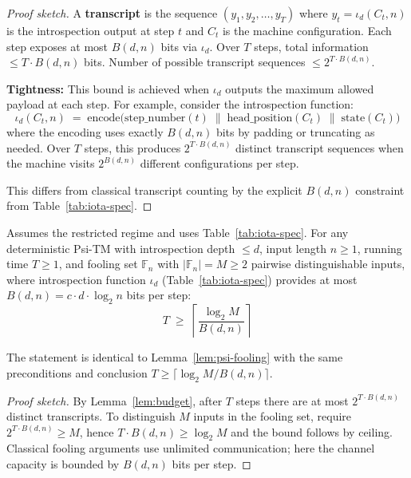 \begin{proof}[Proof sketch]
A \textbf{transcript} is the sequence $(y_1, y_2, \ldots, y_T)$ where $y_t = \iota_d(C_t, n)$ is the introspection output at step $t$ and $C_t$ is the machine configuration. Each step exposes at most $B(d,n)$ bits via $\iota_d$. Over $T$ steps, total information $\leq T \cdot B(d,n)$ bits. Number of possible transcript sequences $\leq 2^{T \cdot B(d,n)}$.

\textbf{Tightness:} This bound is achieved when $\iota_d$ outputs the maximum allowed payload at each step. For example, consider the introspection function:
\[
\iota_d(C_t, n) \;=\; \text{encode}\big(\text{step\_number}(t) \;\|\; \text{head\_position}(C_t) \;\|\; \text{state}(C_t)\big)
\]
where the encoding uses exactly $B(d,n)$ bits by padding or truncating as needed. Over $T$ steps, this produces $2^{T \cdot B(d,n)}$ distinct transcript sequences when the machine visits $2^{B(d,n)}$ different configurations per step.

This differs from classical transcript counting by the explicit $B(d,n)$ constraint from Table~\ref{tab:iota-spec}.
\end{proof}

\begin{lemma}
\label{lem:psi-fooling}
Assumes the restricted regime and uses Table~\ref{tab:iota-spec}.
For any deterministic Psi-TM with introspection depth $\leq d$, input length $n \geq 1$, running time $T \geq 1$, and fooling set $\mathbb{F}_n$ with $|\mathbb{F}_n| = M \geq 2$ pairwise distinguishable inputs, where introspection function $\iota_d$ (Table~\ref{tab:iota-spec}) provides at most $B(d,n) = c \cdot d \cdot \log_{2} n$ bits per step:
\begin{equation}
\label{eq:fooling-bound}
 T \;\geq\; \left\lceil \frac{\log_{2} M}{B(d,n)} \right\rceil
\end{equation}
\end{lemma}

\begin{theorem}
\label{thm:psi-fooling}\label{Lk:psi-fooling}
The statement is identical to Lemma~\ref{lem:psi-fooling} with the same preconditions and conclusion $T\ge \lceil \log_{2} M / B(d,n)\rceil$.
\end{theorem}

\begin{proof}[Proof sketch]
By Lemma~\ref{lem:budget}, after $T$ steps there are at most $2^{T \cdot B(d,n)}$ distinct transcripts. To distinguish $M$ inputs in the fooling set, require $2^{T \cdot B(d,n)} \ge M$, hence $T \cdot B(d,n) \ge \log_{2} M$ and the bound follows by ceiling. Classical fooling arguments use unlimited communication; here the channel capacity is bounded by $B(d,n)$ bits per step.
\end{proof}

